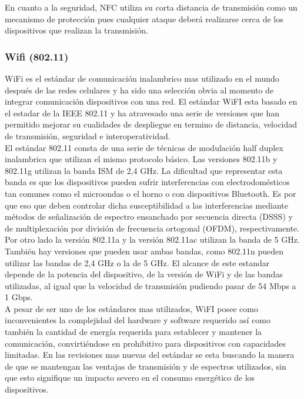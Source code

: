 En cuanto a la seguridad, NFC utiliza su corta distancia de transmisión como un mecanismo de protección pues cualquier ataque deberá realizarse cerca de los dispositivos que realizan la transmisión. 
\subsubsection{Wifi (802.11)} 
WiFi es el estándar de comunicación inalambrico mas utilizado en el mundo después de las redes celulares y ha sido una selección obvia al momento de integrar comunicación dispositivos con una red. El estándar WiFI esta basado en el estadar de la IEEE 802.11\cite{ieee80211} y ha atravesado una serie de versiones que han permitido mejorar su cualidades de despliegue en termino de distancia, velocidad de transmisión, seguridad e interoperatividad.\\  

El estándar 802.11 consta de una serie de técnicas de modulación half duplex inalambrica que utilizan el mismo protocolo básico. Las versiones 802.11b y 802.11g utilizan la banda ISM de 2,4 GHz. La dificultad que representar esta banda es que los dispositivos pueden sufrir interferencias con electrodomésticos tan comunes como el microondas o el horno o con dispositivos Bluetooth. Es por que eso que deben controlar dicha susceptibilidad a las interferencias mediante métodos de señalización de espectro ensanchado por secuencia directa (DSSS) y de multiplexación por división de frecuencia ortogonal (OFDM), respectivamente.\\

Por otro lado la versión 802.11a y la versión 802.11ac utilizan la banda de 5 GHz. También hay versiones que pueden usar ambas bandas, como 802.11n pueden utilizar las bandas de 2,4 GHz o la de 5 GHz. El alcance de este estandar depende de la potencia del dispositivo, de la versión de WiFi y de las bandas utilizadas, al igual que la velocidad de transmisión pudiendo pasar de 54 Mbps a 1 Gbps. \\

A pesar de ser uno de los estándares mas utilizados, WiFI posee como inconvenientes la complejidad del hardware y software requerido así como también la cantidad de energía requerida para  establecer y mantener la comunicación, convirtiéndose en prohibitivo para dispositivos con capacidades limitadas. En las revisiones mas nuevas del estándar se esta buscando  la manera de que se mantengan las ventajas de transmisión y de espectros utilizados, sin que esto signifique un impacto severo en el consumo energético de los dispositivos. 


